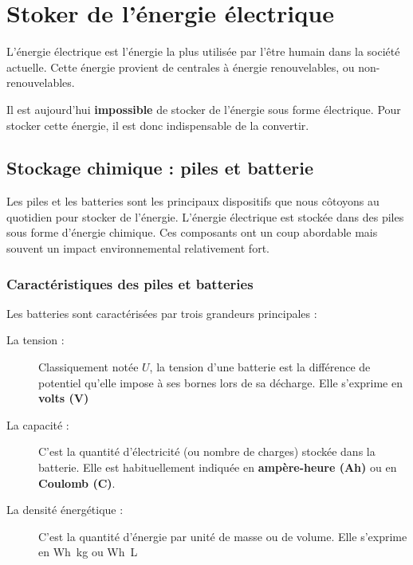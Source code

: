 \documentclass[10pt,fleqn]{article} %
\begin{document}
\section{Stoker de l'énergie électrique}
L'énergie électrique est l'énergie la plus utilisée par l'être humain dans la société actuelle. Cette énergie provient de centrales à énergie renouvelables, ou non-renouvelables. 

Il est aujourd'hui \textbf{impossible} de stocker de l'énergie sous forme électrique. Pour stocker cette énergie, il est donc indispensable de la convertir. 

\subsection{Stockage chimique : piles et batterie}
Les piles et les batteries sont les principaux dispositifs que nous côtoyons au quotidien pour stocker de l'énergie. 
L'énergie électrique est stockée dans des piles sous forme d'énergie chimique. Ces composants ont un coup abordable mais souvent un impact environnemental relativement fort. 

\subsubsection{Caractéristiques des piles et batteries}
Les batteries sont caractérisées par trois grandeurs principales : 
\begin{description}
    \item[La tension :] Classiquement notée $U$, la tension d'une batterie est la différence de potentiel qu'elle impose à ses bornes lors de sa décharge. Elle s'exprime en \textbf{volts (V)}
    
    \item[La capacité : ] C'est la quantité d'électricité (ou nombre de charges) stockée dans la batterie. Elle est habituellement indiquée en \textbf{ampère-heure (Ah)} ou en \textbf{Coulomb (C)}.
    
    \item[La densité énergétique : ]C'est la quantité d'énergie par unité de masse ou de volume. Elle s'exprime en \SI{Wh}{kg} ou \SI{Wh}{L}
    
\end{description}
\end{document}
